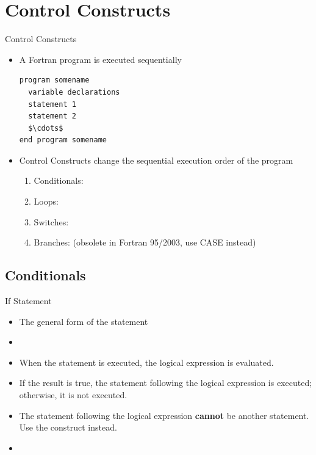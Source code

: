 \documentclass[10pt,t]{beamer}
\begin{document}
\section{Control Constructs}
\begin{frame}[fragile] {Control Constructs}
  \begin{itemize}
    \item A Fortran program is executed sequentially
      \begin{lstlisting}[language={[90]Fortran},mathescape]
program somename 
  variable declarations
  statement 1
  statement 2
  $\cdots$
end program somename
      \end{lstlisting}
    \item Control Constructs change the sequential execution order of the program
      \begin{enumerate} %
        \item Conditionals: 
        \item Loops: 
        \item Switches: 
        \item Branches:  (obsolete in Fortran 95/2003, use CASE instead)
      \end{enumerate}
  \end{itemize}
\end{frame}

\subsection{Conditionals}
\begin{frame}[fragile]{If Statement}
  \begin{itemize}
    \item The general form of the  statement
    \item[] 
    \item When the  statement is executed, the logical expression is evaluated. 
    \item If the result is true, the statement following the logical expression is executed; otherwise, it is not executed.
    \item The statement following the logical expression \textbf{cannot} be another  statement. Use the  construct instead.
    \item[] 
  \end{itemize}
\end{frame}
\end{document}
